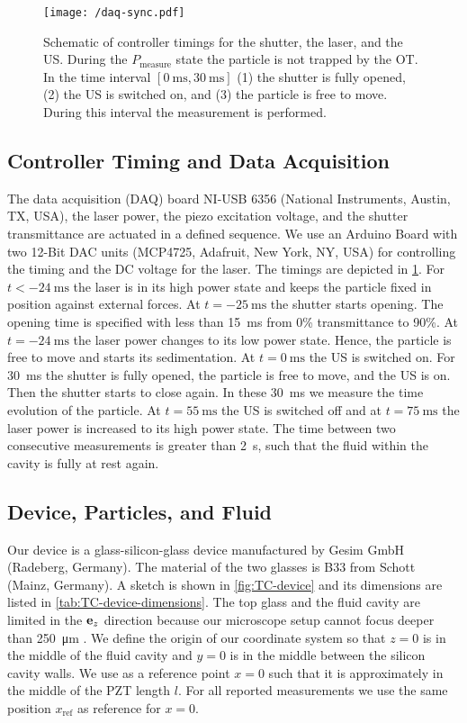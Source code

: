 \begin{figure}[H]
  \centering
  \texttt{[image: /daq-sync.pdf]}
  \caption{Schematic of controller timings for the shutter, the laser, and the 
      US. During the $P_{\text{measure}}$ state the particle is not trapped by 
  the OT. In the time interval $[\SI{0}{\ms}, \SI{30}{\ms}]$ (1) the shutter is 
  fully opened, (2) the US is switched on, and (3) the particle is free to 
  move. During this interval the measurement is performed.}\label{fig:TC-daq-sync}
\end{figure}

\subsection{Controller Timing and Data Acquisition}

The data acquisition (DAQ) board NI-USB 6356 (National Instruments, Austin, TX, 
USA), the laser power, the piezo excitation voltage, and the shutter 
transmittance are actuated in a defined sequence. We use an Arduino Board with 
two 12-Bit DAC units (MCP4725, Adafruit, New York, NY, USA) for controlling the 
timing and the DC voltage for the laser. The timings are depicted in 
\cref{fig:TC-daq-sync}. For $t<-\SI{24}{\ms}$ the laser is in its high power state 
and keeps the particle fixed in position against external forces. At 
$t=\SI{-25}{\ms}$ the shutter starts opening. The opening time is specified 
with less than \SI{15}{\ms} from 0\% transmittance to 90\%. At 
$t=\SI{-24}{\ms}$ the laser power changes to its low power state. Hence, the 
particle is free to move and starts its sedimentation. At $t=\SI{0}{\ms}$ the 
US is switched on. For \SI{30}{\ms} the shutter is fully opened, the particle 
is free to move, and the US is on. Then the shutter starts to close again. In 
these \SI{30}{\ms} we measure the time evolution of the particle. At 
$t=\SI{55}{\ms}$ the US is switched off and at $t=\SI{75}{\ms}$ the laser power 
is increased to its high power state. The time between two consecutive 
measurements is greater than \SI{2}{\s}, such that the fluid within the cavity 
is fully at rest again.

\subsection{Device, Particles, and Fluid}

Our device is a glass-silicon-glass device manufactured by Gesim GmbH 
(Radeberg, Germany). The material of the two glasses is B33 from Schott (Mainz, 
Germany). A sketch is shown in \cref{fig:TC-device} and its dimensions are listed 
in \cref{tab:TC-device-dimensions}. The top glass and the fluid cavity are limited 
in the $\vb{e}_{z}$ direction because our microscope setup cannot focus deeper than 
\SI{250}{\um} \cite{Lamprecht2016,Lamprecht2017}. We define the origin of our 
coordinate system so that $z = 0$ is in the middle of the fluid cavity and $y = 
0$ is in the middle between the silicon cavity walls. We use as a reference 
point $x = 0$ such that it is approximately in the middle of the PZT length 
$l$. For all reported measurements we use the same position $x_{\text{ref}}$ as 
reference for $x=0$.

